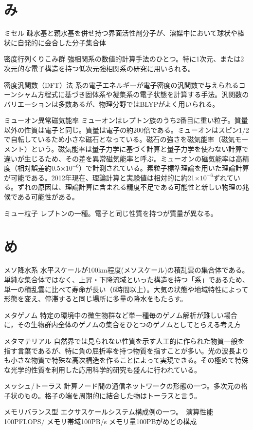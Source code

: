 \begin{用語集}
\section{み}
\item{ミセル}{}
{疎水基と親水基を併せ持つ界面活性剤分子が、溶媒中において球状や棒状に自発的に会合した分子集合体}
\item{密度行列くりこみ群}{}
{強相関系の数値的計算手法のひとつ。特に1次元、または2次元的な電子構造を持つ低次元強相関系の研究に用いられる。}
\item{密度汎関数（DFT）法}{}
{系の電子エネルギーが電子密度の汎関数で与えられるコーンシャム方程式に基づき固体系や凝集系の電子状態を計算する手法。汎関数のバリエーションは多数あるが、物理分野ではBLYPがよく用いられる。}
\item{ミューオン異常磁気能率}{}
{ミューオンはレプトン族のうち2番目に重い粒子。質量以外の性質は電子と同じ。質量は電子の約200倍である。ミューオンはスピン1/2で自転しているため小さな磁石となっている。磁石の強さを磁気能率（磁気モーメント）という。磁気能率は量子力学に基づく計算と量子力学を使わない計算で違いが生じるため、その差を異常磁気能率と呼ぶ。ミューオンの磁気能率は高精度（相対誤差約0.5×$10^{-6}$）で計測されている。素粒子標準理論を用いた理論計算が可能である。2012年現在、理論計算と実験値は相対的に約21×$10^{-6}$ずれている。ずれの原因は、理論計算に含まれる精度不足である可能性と新しい物理の兆候である可能性がある。}
\item{ミュー粒子}{}
{レプトンの一種。電子と同じ性質を持つが質量が異なる。}
\section{め}
\item{メソ降水系}{}
{水平スケールが100km程度(メソスケール)の積乱雲の集合体である。単純な集合体ではなく、上昇・下降流域といった構造を持つ「系」であるため、単一の積乱雲に比べて寿命が長い（6時間以上）。大気の状態や地域特性によって形態を変え、停滞すると同じ場所に多量の降水をもたらす。}
\item{メタゲノム}{}
{特定の環境中の微生物群など単一種毎のゲノム解析が難しい場合に，その生物群内全体のゲノムの集合をひとつのゲノムとしてとらえる考え方}
\item{メタマテリアル}{}
{自然界では見られない性質を示す人工的に作られた物質一般を指す言葉であるが、特に負の屈折率を持つ物質を指すことが多い。光の波長よりも小さな物質で特殊な高次構造を作ることによって実現できる。その極めて特殊な光学的性質を利用した応用科学的研究も盛んに行われている。}
\item{メッシュ/トーラス}{}
{計算ノード間の通信ネットワークの形態の一つ。多次元の格子状のもの。格子の端を周期的に結合した物はトーラスと言う。}
\item{メモリバランス型}{}
{エクサスケールシステム構成例の一つ。　演算性能100PFLOPS/ メモリ帯域100PB/s メモリ量100PBがめどの構成}

\end{用語集}
